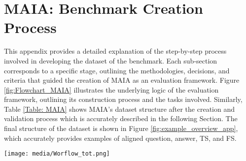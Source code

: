 

\section{MAIA: Benchmark Creation Process}
\label{sec:appendixA}


This appendix provides a detailed explanation of the step-by-step process involved in developing the dataset of the benchmark. Each sub-section corresponds to a specific stage, outlining the methodologies, decisions, and criteria that guided the creation of MAIA as an evaluation framework.
Figure \ref{fig:Flowchart_MAIA} illustrates the underlying logic of the evaluation framework, outlining its construction process and the tasks involved. Similarly, Table \ref{Table: MAIA} shows MAIA's dataset structure after the creation and validation process which is accurately described in the following Section. The final structure of the dataset is shown in Figure \ref{fig:example_overview_app}, which accurately provides  examples of aligned question, answer, TS, and FS. 

\begin{figure*}[ht!]
    \centering
    \texttt{[image: media/Worflow\_tot.png]}
    \caption{Workflow of the MAIA evaluation framework, integrating dataset construction with its application to the two main benchmark tasks.}
    \label{fig:Flowchart_MAIA}
\end{figure*}








\begin{table}[ht]
\centering
{}
  \caption{\label{Table: MAIA}
    MAIA Statistics
  }
\end{table}



